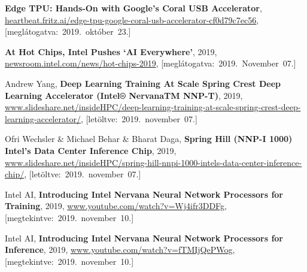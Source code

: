 \begin{thebibliography}{9}

	\textbf{Edge TPU: Hands-On with Google’s Coral USB Accelerator},
	{\footnotesize\url{heartbeat.fritz.ai/edge-tpu-google-coral-usb-accelerator-cf0d79c7ec56}},
	\mbox{[meglátogatva:~2019.~október~23.]}




	\textbf{At Hot Chips, Intel Pushes ‘AI Everywhere’},
	2019,
	{\footnotesize\url{newsroom.intel.com/news/hot-chips-2019}},
	\mbox{[meglátogatva:~2019.~November~07.]}

	Andrew Yang,
	\textbf{Deep Learning Training At Scale	Spring Crest Deep Learning Accelerator (Intel® NervanaTM NNP-T)},
	2019,
	{\footnotesize\url{www.slideshare.net/insideHPC/deep-learning-training-at-scale-spring-crest-deep-learning-accelerator/}},
	\mbox{[letöltve:~2019.~november~07.]}

	Ofri Wechsler \& Michael Behar \& Bharat Daga,
	\textbf{Spring Hill (NNP-I 1000) Intel’s Data Center Inference Chip},
	2019,
	{\footnotesize\url{www.slideshare.net/insideHPC/spring-hill-nnpi-1000-intels-data-center-inference-chip/}},
	\mbox{[letöltve:~2019.~november~07.]}

Intel AI,
\textbf{Introducing Intel Nervana Neural Network Processors for Training},
2019,
{\footnotesize\url{www.youtube.com/watch?v=Wj4ifr3DDFg}},
\mbox{[megtekintve:~2019.~november~10.]}

	Intel AI,
	\textbf{Introducing Intel Nervana Neural Network Processors for Inference},
	2019,
	{\footnotesize\url{www.youtube.com/watch?v=fTMIjQePWog}},
	\mbox{[megtekintve:~2019.~november~10.]}



\end{thebibliography}
